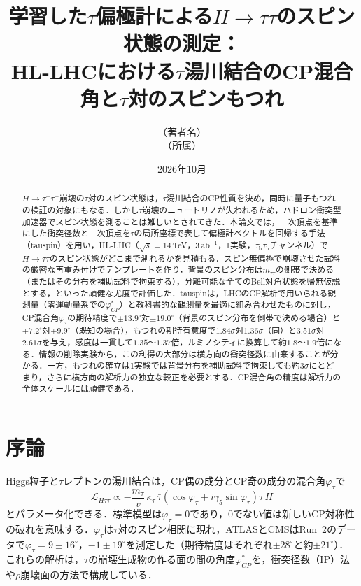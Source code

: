 \documentclass[paper=a4,fontsize=10pt,jafontsize=10pt,line_length=44zw,number_of_lines=46]{jlreq}
\title{学習した$\tau$偏極計による$H\to\tau\tau$のスピン状態の測定：\\HL-LHCにおける$\tau$湯川結合のCP混合角と$\tau$対のスピンもつれ}
\author{（著者名）\\（所属）}
\date{2026年10月}
\newcommand{\tauh}{\tau_{\mathrm{h}}}
\newcommand{\abinv}{\,\mathrm{ab}^{-1}}
\newcommand{\phicp}{\varphi^{*}_{CP}}
\begin{document}
\maketitle

\begin{abstract}
$H\to\tau^+\tau^-$崩壊の$\tau$対のスピン状態は，$\tau$湯川結合のCP性質を決め，同時に量子もつれの検証の対象にもなる．しかし$\tau$崩壊のニュートリノが失われるため，ハドロン衝突型加速器でスピン状態を測ることは難しいとされてきた．本論文では，一次頂点を基準にした衝突径数と二次頂点を$\tau$の局所座標で表して偏極計ベクトルを回帰する手法（tauspin）を用い，HL-LHC（$\sqrt s=14$\,TeV，$3\abinv$，1実験，$\tauh\tauh$チャンネル）で$H\to\tau\tau$のスピン状態がどこまで測れるかを見積もる．スピン無偏極で崩壊させた試料の厳密な再重み付けでテンプレートを作り，背景のスピン分布は$m_{\tau\tau}$の側帯で決める（またはその分布を補助試料で拘束する），分離可能な全てのBell対角状態を帰無仮説とする，といった頑健な尤度で評価した．tauspinは，LHCのCP解析で用いられる観測量（零運動量系での$\phicp$）と教科書的な観測量を最適に組み合わせたものに対し，CP混合角$\varphi_\tau$の期待精度で$\pm13.9^\circ$対$\pm19.0^\circ$（背景のスピン分布を側帯で決める場合）と$\pm7.2^\circ$対$\pm9.9^\circ$（既知の場合），もつれの期待有意度で$1.84\sigma$対$1.36\sigma$（同）と$3.51\sigma$対$2.61\sigma$を与え，感度は一貫して$1.35$〜$1.37$倍，ルミノシティに換算して約$1.8$〜$1.9$倍になる．情報の削除実験から，この利得の大部分は横方向の衝突径数に由来することが分かる．一方，もつれの確立は1実験では背景分布を補助試料で拘束しても約$3\sigma$にとどまり，さらに横方向の解析力の独立な較正を必要とする．CP混合角の精度は解析力の全体スケールには頑健である．
\end{abstract}

\section{序論}

Higgs粒子と$\tau$レプトンの湯川結合は，CP偶の成分とCP奇の成分の混合角$\varphi_\tau$で
\begin{equation}
  \mathcal L_{H\tau\tau}\propto -\frac{m_\tau}{v}\,\kappa_\tau\,\bar\tau\left(\cos\varphi_\tau+i\gamma_5\sin\varphi_\tau\right)\tau\,H
\end{equation}
とパラメータ化できる．標準模型は$\varphi_\tau=0$であり，0でない値は新しいCP対称性の破れを意味する．$\varphi_\tau$は$\tau$対のスピン相関に現れ，ATLASとCMSはRun~2のデータで$\varphi_\tau=9\pm16^\circ$\cite{ATLAS:2022akr}，$-1\pm19^\circ$\cite{CMS:2021sdq}を測定した（期待精度はそれぞれ$\pm28^\circ$と約$\pm21^\circ$）．これらの解析は，$\tau$の崩壊生成物の作る面の間の角度$\phicp$\cite{Berge:2008dr,Berge:2015nua}を，衝突径数（IP）法や$\rho$崩壊面の方法で構成している．
\end{document}
